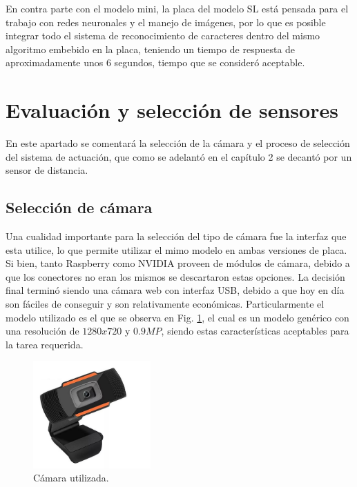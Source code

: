 En contra parte con el modelo mini, la placa del modelo SL está pensada para el trabajo con redes neuronales y el manejo de imágenes, por lo que es posible integrar todo el sistema de reconocimiento de caracteres dentro del mismo algoritmo embebido en la placa, teniendo un tiempo de respuesta de aproximadamente unos 6 segundos, tiempo que se consideró aceptable.

\section{Evaluación y selección de sensores}

En este apartado se comentará la selección de la cámara y el proceso de selección del sistema de actuación, que como se adelantó en el capítulo 2 se decantó por un sensor de distancia.

\subsection{Selección de cámara}

Una cualidad importante para la selección del tipo de cámara fue la interfaz que esta utilice, lo que permite utilizar el mimo modelo en ambas versiones de placa. Si bien, tanto Raspberry como NVIDIA proveen de módulos de cámara, debido a que los conectores no eran los mismos se descartaron estas opciones. La decisión final terminó siendo una cámara web con interfaz USB, debido a que hoy en día son fáciles de conseguir y son relativamente económicas. Particularmente el modelo utilizado es el que se observa en Fig. \ref{fig:camara-usb}, el cual es un modelo genérico con una resolución de $1280x720$ y $0.9MP$, siendo estas características aceptables para la tarea requerida.

\begin{figure}
    \centering
    \includegraphics[width=0.4\textwidth]{imgs/camara-usb.jpg}
    \caption{Cámara utilizada.}
    \label{fig:camara-usb}
\end{figure}

